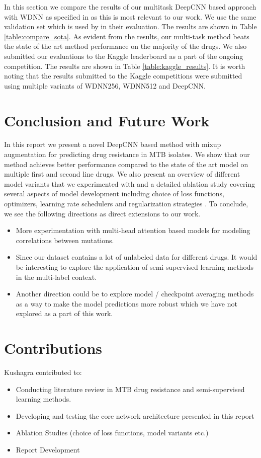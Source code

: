 \documentclass{article}
\begin{document}
In this section we compare the results of our multitask DeepCNN based approach with WDNN as specified in \cite{CHEN2019356} as
this is most relevant to our work. We use the same validation set 
which is used by \cite{CHEN2019356} in their evaluation. The results are shown in Table \ref{table:compare_sota}. As evident
from the results, our multi-task method beats the state of the art method performance on the majority 
of the drugs. We also submitted our evaluations to the Kaggle leaderboard as a part of the ongoing
competition. The results are shown in Table \ref{table:kaggle_results}. It is worth
noting that the results submitted to the Kaggle competitions were submitted using multiple
variants of WDNN256, WDNN512 and DeepCNN.

\section{Conclusion and Future Work}
In this report we present a novel DeepCNN based method with mixup augmentation
 for predicting drug resistance in MTB isolates. We show that our method achieves
better performance compared to the state of the art model on multiple first and 
second line drugs. We also
present an overview of different model variants that we experimented with and a 
detailed ablation study covering several aspects of model development including
choice of loss functions, optimizers, learning rate schedulers and regularization strategies
. To conclude,
we see the following directions as direct extensions to our work.
\begin{itemize}
  \item More experimentation with multi-head attention based models for modeling correlations
  between mutations.
  \item Since our dataset contains a lot of unlabeled data for different drugs. It would
  be interesting to explore the application of semi-supervised learning methods in 
  the multi-label context.
  \item Another direction could be to explore model / checkpoint averaging methods
  as a way to make the model predictions more robust which we have not explored as a part
  of this work.
\end{itemize}

\section{Contributions}
Kushagra contributed to:
\begin{itemize}
  \item Conducting literature review in MTB drug resistance and semi-supervised
  learning methods.
  \item Developing and testing the core network architecture presented in this report
  \item Ablation Studies (choice of loss functions, model variants etc.)
  \item Report Development
\end{itemize} 


\end{document}
